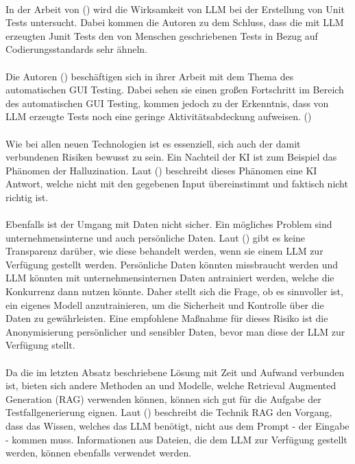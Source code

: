 \documentclass[12pt,toc=bib,toc=listof]{scrreprt}
\begin{document}
\\
In der Arbeit von (\cite{Ouédraogo2024}) wird die Wirksamkeit von LLM bei der Erstellung von Unit Tests untersucht. Dabei kommen die Autoren zu dem Schluss, dass die mit LLM erzeugten Junit Tests den von Menschen geschriebenen Tests in Bezug auf Codierungsstandards sehr ähneln.\\
\\
Die Autoren (\cite{Liu2024}) beschäftigen sich in ihrer Arbeit mit dem Thema des automatischen GUI Testing.
Dabei sehen sie einen großen Fortschritt im Bereich des automatischen GUI Testing, kommen jedoch zu der Erkenntnis, dass von LLM erzeugte Tests noch eine geringe Aktivitätsabdeckung aufweisen. (\cite{Liu2024})\\
\\
Wie bei allen neuen Technologien ist es essenziell, sich auch der damit verbundenen Risiken bewusst zu sein. Ein Nachteil der KI ist zum Beispiel das Phänomen der Halluzination. Laut (\cite{Siebert2024}) beschreibt dieses Phänomen eine KI Antwort, welche nicht mit den gegebenen Input übereinstimmt und faktisch nicht richtig ist.\\
\\
Ebenfalls ist der Umgang mit Daten nicht sicher. Ein mögliches Problem sind unternehmensinterne und auch persönliche Daten. Laut (\cite{Möllers2024}) gibt es keine Transparenz darüber, wie diese behandelt werden, wenn sie einem LLM zur Verfügung gestellt werden. Persönliche Daten könnten missbraucht werden und LLM könnten mit unternehmensinternen Daten antrainiert werden, welche die Konkurrenz dann nutzen könnte. Daher stellt sich die Frage, ob es sinnvoller ist, ein eigenes Modell anzutrainieren, um die Sicherheit und Kontrolle über die Daten zu gewährleisten. Eine empfohlene Maßnahme für dieses Risiko ist die Anonymisierung persönlicher und sensibler Daten, bevor man diese der LLM zur Verfügung stellt.\\
\\
Da die im letzten Absatz beschriebene Lösung mit Zeit und Aufwand verbunden ist, bieten sich andere Methoden an und Modelle, welche Retrieval Augmented Generation (RAG) verwenden können, können sich gut für die Aufgabe der Testfallgenerierung eignen. Laut (\cite{Honroth2024}) beschreibt die Technik RAG den Vorgang, dass das Wissen, welches das LLM benötigt, nicht aus dem Prompt - der Eingabe - kommen muss. Informationen aus Dateien, die dem LLM zur Verfügung gestellt werden, können ebenfalls verwendet werden.\\
\\
\end{document}
